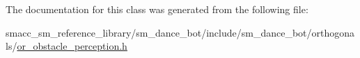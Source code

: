 The documentation for this class was generated from the following file\+:\begin{DoxyCompactItemize}
\item 
smacc\+\_\+sm\+\_\+reference\+\_\+library/sm\+\_\+dance\+\_\+bot/include/sm\+\_\+dance\+\_\+bot/orthogonals/\hyperlink{or__obstacle__perception_8h}{or\+\_\+obstacle\+\_\+perception.\+h}\end{DoxyCompactItemize}
